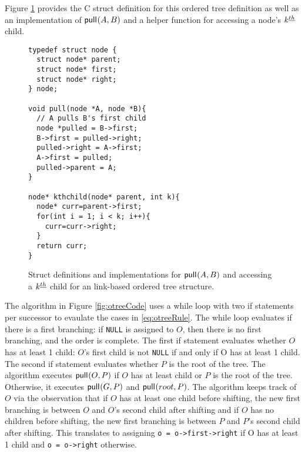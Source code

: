 Figure \ref{fig:otreestarter-link} provides the C struct definition for this ordered tree definition as well as an implementation of $\mathsf{pull}_{}(A,B)$ and a helper function for accessing a node's $k^{\underline{th}}$ child. 

\begin{figure}
	\begin{center}

	    \begin{Verbatim}
typedef struct node {
  struct node* parent;
  struct node* first;
  struct node* right;
} node;

void pull(node *A, node *B){ 
  // A pulls B's first child
  node *pulled = B->first;
  B->first = pulled->right;
  pulled->right = A->first;
  A->first = pulled;
  pulled->parent = A;
}

node* kthchild(node* parent, int k){
  node* curr=parent->first;
  for(int i = 1; i < k; i++){
    curr=curr->right;
  }
  return curr;
}
\end{Verbatim}

    \cprotect\caption{Struct definitions and implementations for $\mathsf{pull}_{}(A,B)$ and accessing a $k^{\underline{th}}$ child for an link-based ordered tree structure.}
\label{fig:otreestarter-link}
	\end{center}
\end{figure}

    The algorithm in Figure \ref{fig:otreeCode} uses a while loop with two if statements per successor to evaulate the cases in \eqref{eq:otreeRule}.  The while loop evaluates if there is a first branching: if \verb+NULL+ is assigned to $O$, then there is no first branching, and the order is complete.  The first if statement evaluates whether $O$ has at least 1 child: $O$'s first child is not \verb+NULL+ if and only if O has at least 1 child. The second if statement evaluates whether $P$ is the root of the tree.  The algorithm executes $\mathsf{pull}_{}(O,P)$ if $O$ has at least child or $P$ is the root of the tree.  Otherwise, it executes $\mathsf{pull}_{}(G,P)$ and $\mathsf{pull}_{}(root,P)$.  The algorithm keeps track of $O$ via the observation that if $O$ has at least one child before shifting, the new first branching is between $O$ and $O$'s second child after shifting and if $O$ has no children before shifting, the new first branching is between $P$ and $P$'s second child after shifting. This translates to assigning \verb+o = o->first->right+ if O has at least 1 child and \verb+o = o->right+ otherwise.

